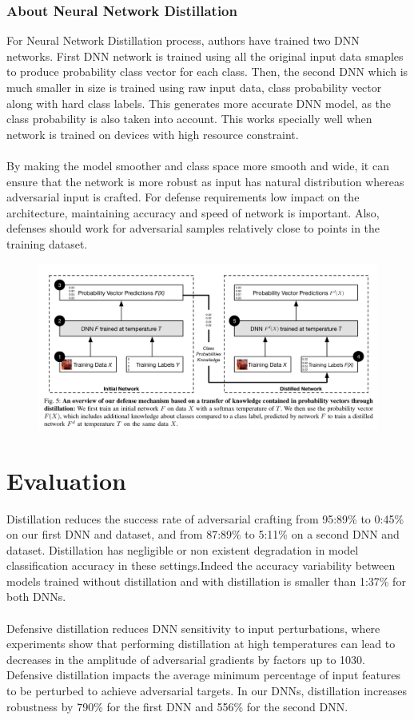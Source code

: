 \documentclass[12pt]{article}
\begin{document}
\subsubsection*{About Neural Network Distillation}
For Neural Network Distillation process, authors have trained two DNN networks. First DNN network is trained using all the original input data smaples to produce probability class vector for each class. Then, the second DNN which is much smaller in size is trained using raw input data, class probability vector along with hard class labels. This generates more accurate DNN model, as the class probability is also taken into account. This works specially well when network is trained on devices with high resource constraint.\\\\
By making the model smoother and class space more smooth and wide, it can ensure that the network is more robust as input has natural distribution whereas adversarial input is crafted. For defense requirements low impact on the architecture, maintaining accuracy and speed of network is important. Also, defenses should work for adversarial samples relatively
close to points in the training dataset.
\begin{figure}[H]
\begin{center}
\includegraphics[scale=.22]{distillation-defense-fig-5}
\end{center}
\end{figure} 
\section*{Evaluation\cite{paper}}
Distillation reduces the success rate of adversarial crafting from 95:89\% to 0:45\% on our first DNN and dataset, and from 87:89\% to 5:11\% on a second DNN and dataset. Distillation has negligible or non existent degradation in model classification accuracy in these settings.Indeed the accuracy variability between models trained without distillation and with
distillation is smaller than 1:37\% for both DNNs.\\\\
Defensive distillation reduces DNN sensitivity to input perturbations, where
experiments show that performing distillation at high temperatures can lead to decreases in the amplitude of adversarial gradients by factors up to 1030.\\
Defensive distillation impacts the average minimum percentage of input features to be perturbed to achieve adversarial targets. In our DNNs, distillation increases robustness by 790\% for the first DNN and 556\% for the second DNN.
\end{document}
